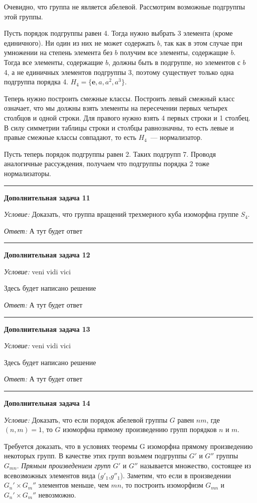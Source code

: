 \documentclass[12pt,a4paper]{article}
\newcommand{\sbs}{\large \bfseries}
\newcommand{\rl}{\vspace{16pt} \hrule \vspace{8pt}}
\begin{document}
Очевидно, что группа не является абелевой. Рассмотрим возможные подгруппы этой группы.\null

Пусть порядок подгруппы равен 4. Тогда нужно выбрать 3 элемента (кроме единичного). Ни один из них не может содержать $b$, так как в этом случае при умножении на степень элемента без $b$ получим все элементы, содержащие $b$. Тогда все элементы, содержащие $b$, должны быть в подгруппе, но элементов с $b$ 4, а не единичных элементов подгруппы 3, поэтому существует только одна подгруппа порядка 4. $H_4 = \{\boldsymbol{e}, a, a^2, a^3\}$.\null

Теперь нужно построить смежные классы. Построить левый смежный класс означает, что мы должны взять элементы на пересечении первых четырех столбцов и одной строки. Для правого нужно взять 4 первых строки и 1 столбец. В силу симметрии таблицы строки и столбцы равнозначны, то есть левые и правые смежные классы совпадают, то есть $H_4$~--- нормализатор.\null

Пусть теперь порядок подгруппы равен 2. Таких подгрупп 7. Проводя аналогичные рассуждения, получаем что подгруппы порядка 2 тоже нормализаторы.




\rl
{\sbs Дополнительная задача 11}

{\itshape Условие: } Доказать, что группа вращений трехмерного куба изоморфна группе $S_4$.

{\itshape Ответ: } А тут будет ответ




\rl
{\sbs Дополнительная задача 12}

{\itshape Условие: } veni vidi vici

Здесь будет написано решение

{\itshape Ответ: } А тут будет ответ




\rl
{\sbs Дополнительная задача 13}

{\itshape Условие: } veni vidi vici

Здесь будет написано решение

{\itshape Ответ: } А тут будет ответ




\rl
{\sbs Дополнительная задача 14}

{\itshape Условие: } Доказать, что если порядок абелевой группы $G$ равен $nm$, где $(n,m) = 1$, то $G$ изоморфна прямому произведению групп порядков $n$ и $m$.

Требуется доказать, что в условиях теоремы G изоморфна прямому произведению некоторых групп. В качестве этих групп возьмем подгруппы  $G'$ и $G''$ группы $G_{mn}$.
\textit{Прямым произведением групп} $G'$ и $G''$ называется множество, состоящее из всевозможных элементов вида ($g'_1$,$g''_1$). Заметим, что если в произведении $G_n' \times G_m'' $ элементов меньше, чем $mn$, то построить изоморфизм $G_{mn}$ и $G_n' \times G_m'' $ невозможно.
\end{document}
